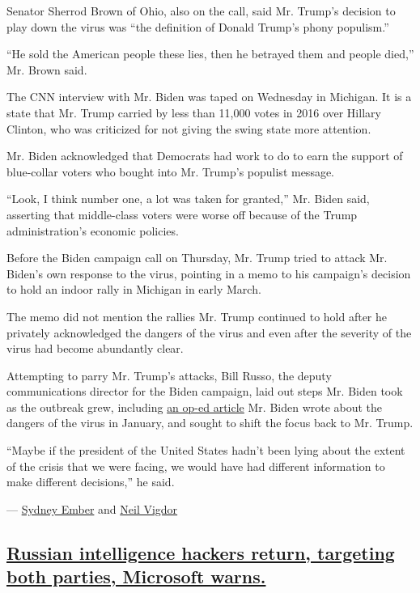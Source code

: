 Senator Sherrod Brown of Ohio, also on the call, said Mr. Trump's
decision to play down the virus was ``the definition of Donald Trump's
phony populism.''

``He sold the American people these lies, then he betrayed them and
people died,'' Mr. Brown said.

The CNN interview with Mr. Biden was taped on Wednesday in Michigan. It
is a state that Mr. Trump carried by less than 11,000 votes in 2016 over
Hillary Clinton, who was criticized for not giving the swing state more
attention.

Mr. Biden acknowledged that Democrats had work to do to earn the support
of blue-collar voters who bought into Mr. Trump's populist message.

``Look, I think number one, a lot was taken for granted,'' Mr. Biden
said, asserting that middle-class voters were worse off because of the
Trump administration's economic policies.

Before the Biden campaign call on Thursday, Mr. Trump tried to attack
Mr. Biden's own response to the virus, pointing in a memo to his
campaign's decision to hold an indoor rally in Michigan in early March.

The memo did not mention the rallies Mr. Trump continued to hold after
he privately acknowledged the dangers of the virus and even after the
severity of the virus had become abundantly clear.

Attempting to parry Mr. Trump's attacks, Bill Russo, the deputy
communications director for the Biden campaign, laid out steps Mr. Biden
took as the outbreak grew, including
\href{https://www.usatoday.com/story/opinion/2020/01/27/coronavirus-donald-trump-made-us-less-prepared-joe-biden-column/4581710002/}{an
op-ed article} Mr. Biden wrote about the dangers of the virus in
January, and sought to shift the focus back to Mr. Trump.

``Maybe if the president of the United States hadn't been lying about
the extent of the crisis that we were facing, we would have had
different information to make different decisions,'' he said.

--- \href{https://www.nytimes3xbfgragh.onion/by/sydney-ember}{Sydney
Ember} and \href{https://www.nytimes3xbfgragh.onion/by/neil-vigdor}{Neil
Vigdor}

\hypertarget{russian-intelligence-hackers-return-targeting-both-parties-microsoft-warns}{%
\subsection{\texorpdfstring{\protect\hyperlink{russian-intelligence-hackers-return-targeting-both-parties-microsoft-warns}{Russian
intelligence hackers return, targeting both parties, Microsoft
warns.}}{Russian intelligence hackers return, targeting both parties, Microsoft warns.}}\label{russian-intelligence-hackers-return-targeting-both-parties-microsoft-warns}}

